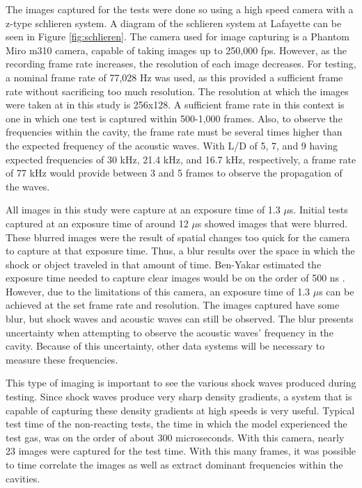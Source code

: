 The images captured for the tests were done so using a high speed camera with a z-type schlieren system. A diagram of the schlieren system at Lafayette can be seen in Figure \ref{fig:schlieren}. The camera used for image capturing is a Phantom Miro m310 camera, capable of taking images up to 250,000 fps. However, as the recording frame rate increases, the resolution of each image decreases. For testing, a nominal frame rate of 77,028 Hz was used, as this provided a sufficient frame rate without sacrificing too much resolution. The resolution at which the images were taken at in this study is 256x128. A sufficient frame rate in this context is one in which one test is captured within 500-1,000 frames. Also, to observe the frequencies within the cavity, the frame rate must be several times higher than the expected frequency of the acoustic waves. With L/D of 5, 7, and 9 having expected frequencies of 30 kHz, 21.4 kHz, and 16.7 kHz, respectively, a frame rate of 77 kHz would provide between 3 and 5 frames to observe the propagation of the waves.

All images in this study were capture at an exposure time of 1.3 $\mu$s. Initial tests captured at an exposure time of around 12 $\mu$s showed images that were blurred. These blurred images were the result of spatial changes too quick for the camera to capture at that exposure time. Thus, a blur results over the space in which the shock or object traveled in that amount of time. Ben-Yakar estimated the exposure time needed to capture clear images would be on the order of 500 ns \cite{ben2000experimental}. However, due to the limitations of this camera, an exposure time of 1.3 $\mu$s can be achieved at the set frame rate and resolution. The images captured have some blur, but shock waves and acoustic waves can still be observed. The blur presents uncertainty when attempting to observe the acoustic waves' frequency in the cavity. Because of this uncertainty, other data systems will be necessary to measure these frequencies. 

This type of imaging is important to see the various shock waves produced during testing. Since shock waves produce very sharp density gradients, a system that is capable of capturing these density gradients at high speeds is very useful. Typical test time of the non-reacting tests, the time in which the model experienced the test gas,  was on the order of about 300 microseconds. With this camera, nearly 23 images were captured for the test time.  With this many frames, it was possible to time correlate the images as well as extract dominant frequencies within the cavities.

